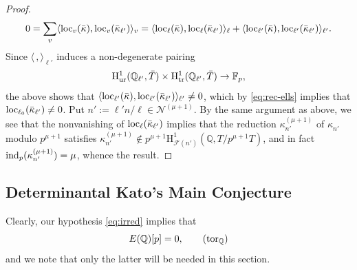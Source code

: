 \documentclass[10pt,reqno]{amsart}
\numberwithin{equation}{section}
\theoremstyle{plain}
\theoremstyle{definition}
\theoremstyle{definition}
\theoremstyle{plain}
\theoremstyle{plain}
\theoremstyle{plain}
\theoremstyle{plain}
\theoremstyle{plain}
\theoremstyle{plain}
\newcommand{\Q}{\mathbb{Q}}
\newcommand{\Fcal}{\mathcal{F}}
\newcommand{\rH}{\mathrm{H}}
\begin{document}
\begin{proof}
\begin{equation}
0=\sum_v\langle{\rm loc}_{v}(\bar{\kappa}),{\rm loc}_v(\bar{\kappa}_{\ell'})\rangle_v=\langle{\rm loc}_{\ell}(\bar{\kappa}),{\rm loc}_{\ell}(\bar{\kappa}_{\ell'})\rangle_{\ell}+
\langle{\rm loc}_{\ell'}(\bar{\kappa}),{\rm loc}_{\ell'}(\bar{\kappa}_{\ell'})\rangle_{\ell'}.
\end{equation}
Since $\langle\,,\rangle_{\ell'}$ induces a non-degenerate pairing 
\[
\rH^1_{\rm ur}(\Q_{\ell'},\bar{T})\times \rH^1_{\rm tr}(\Q_{\ell'},\bar{T})\rightarrow\mathbb{F}_p,
\]
the above shows that $\langle{\rm loc}_{\ell'}(\bar{\kappa}),{\rm loc}_{\ell'}(\bar{\kappa}_{\ell'})\rangle_{\ell'}\neq 0$, which by \eqref{eq:rec-ells} implies that ${\rm loc}_{\ell_0}(\bar{\kappa}_{\ell'})\neq 0$. Put $n':=\ell'n/\ell\in\mathcal{N}^{(\mu+1)}$. By the same argument as above, %
we see that the nonvanishing of ${\rm loc}_{\ell}(\bar{\kappa}_{\ell'})$ implies that the reduction $\kappa_{n'}^{(\mu+1)}$ of $\kappa_{n'}^{}$  modulo $p^{\mu+1}$ satisfies $\kappa_{n'}^{(\mu+1)}\notin p^{\mu+1}\rH^1_{\Fcal(n')}(\Q,T/p^{\mu+1}T)$, and in fact ${\rm ind}_p(\kappa_{n'}^{(\mu+1)})=\mu$, whence the result.
\end{proof}




\subsection{Determinantal Kato's Main Conjecture}\label{subsec:IMC-kato}

Clearly, our hypothesis \eqref{eq:irred} implies that
\begin{equation}\label{eq:Q-tor}
E(\Q)[p]=0,\tag{${\rm tor}_{\Q}$}
\end{equation}
and we note that only the latter will be needed in this section. 
\end{document}
